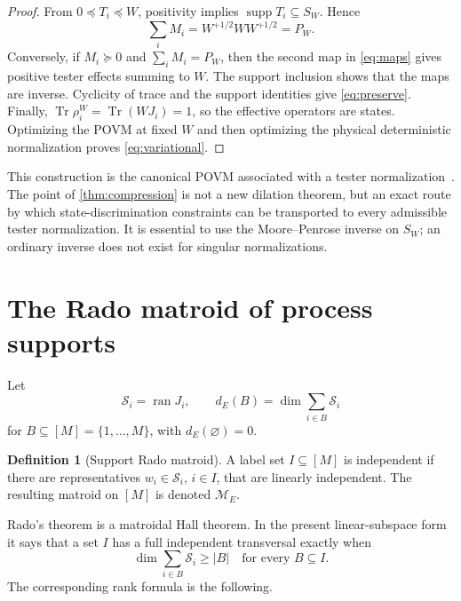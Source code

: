 \documentclass[11pt]{article}
\theoremstyle{definition}
\newtheorem{definition}[theorem]{Definition}
\theoremstyle{remark}
\newcommand{\supp}{\operatorname{supp}}
\newcommand{\ran}{\operatorname{ran}}
\newcommand{\Tr}{\operatorname{Tr}}
\newcommand{\cM}{\mathcal M}
\newcommand{\cS}{\mathcal S}
\begin{document}
\begin{proof}
From $0\preceq T_i\preceq W$, positivity implies
$\supp T_i\subseteq S_W$.  Hence
\[
 \sum_iM_i=W^{+1/2}WW^{+1/2}=P_W.
\]
Conversely, if $M_i\succeq0$ and $\sum_iM_i=P_W$, then the second map in
\cref{eq:maps} gives positive tester effects summing to $W$.  The support
inclusion shows that the maps are inverse.  Cyclicity of trace and the support
identities give \cref{eq:preserve}.  Finally,
$\Tr\rho_i^W=\Tr(WJ_i)=1$, so the effective operators are states.
Optimizing the POVM at fixed $W$ and then optimizing the physical
deterministic normalization proves \cref{eq:variational}.
\end{proof}

This construction is the canonical POVM associated with a tester
normalization~\cite{sedlak2016}.  The point of \cref{thm:compression} is not a
new dilation theorem, but an exact route by which state-discrimination
constraints can be transported to every admissible tester normalization.  It
is essential to use the Moore--Penrose inverse on $S_W$; an ordinary inverse
does not exist for singular normalizations.

\section{The Rado matroid of process supports}

Let
\begin{equation}
              \cS_i=\ran J_i,\qquad
 d_E(B)=\dim\sum_{i\in B}\cS_i                         \label{eq:de}
\end{equation}
for $B\subseteq[M]=\{1,\ldots,M\}$, with $d_E(\varnothing)=0$.

\begin{definition}[Support Rado matroid]\label{def:rado}
A label set $I\subseteq[M]$ is independent if there are representatives
$w_i\in\cS_i$, $i\in I$, that are linearly independent.  The resulting
matroid on $[M]$ is denoted $\cM_E$.
\end{definition}

Rado's theorem is a matroidal Hall theorem.  In the present linear-subspace
form it says that a set $I$ has a full independent transversal exactly when
\begin{equation}
           \dim\sum_{i\in B}\cS_i\geq |B|
           \quad\text{for every }B\subseteq I.          \label{eq:hallrado}
\end{equation}
The corresponding rank formula is the following.
\end{document}
